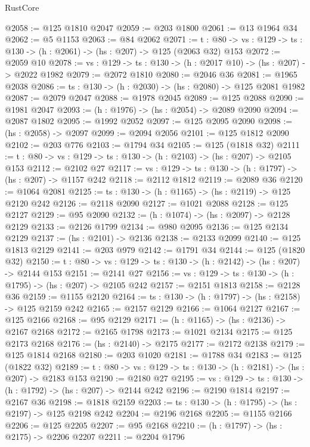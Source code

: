 \begin{lexlean}{RustCore}
\begin{coremodule}
@2058 := @125 @1810 @2047
@2059 := @203 @1800
@2061 := @13 @1964 @34
@2062 := @5 @1153
@2063 := @84 @2062
@2071 := {t : @80} ->
  {vs : @129} -> {ts : @130} -> (h : @2061) -> (hs : @207) -> @125 (@2063 @32) @153
@2072 := @2059 @10
@2078 := {vs : @129} -> {ts : @130} -> (h : @2017 @10) -> (hs : @207) -> @2022 @1982
@2079 := @2072 @1810
@2080 := @2046 @36
@2081 := @1965 @2038
@2086 := {ts : @130} -> (h : @2030) -> (hs : @2080) -> @125 @2081 @1982
@2087 := @2079 @2047
@2088 := @1978 @2045
@2089 := @125 @2088
@2090 := @1981 @2047
@2093 := (h : @1976) -> (hs : @2054) -> @2089 @2090
@2094 := @2087 @1802
@2095 := @1992 @2052
@2097 := @125 @2095 @2090
@2098 := (hs : @2058) -> @2097
@2099 := @2094 @2056
@2101 := @125 @1812 @2090
@2102 := @203 @776
@2103 := @1794 @34
@2105 := @125 (@1818 @32)
@2111 := {t : @80} -> {vs : @129} -> {ts : @130} -> (h : @2103) -> (hs : @207) -> @2105 @153
@2112 := @2102 @27
@2117 := {vs : @129} -> {ts : @130} -> (h : @1797) -> (hs : @207) -> @1157 @242
@2118 := @2112 @1812
@2119 := @2089 @36
@2120 := @1064 @2081
@2125 := {ts : @130} -> (h : @1165) -> (hs : @2119) -> @125 @2120 @242
@2126 := @2118 @2090
@2127 := @1021 @2088
@2128 := @125 @2127
@2129 := @95 @2090
@2132 := (h : @1074) -> (hs : @2097) -> @2128 @2129
@2133 := @2126 @1799
@2134 := @980 @2095
@2136 := @125 @2134 @2129
@2137 := (hs : @2101) -> @2136
@2138 := @2133 @2099
@2140 := @125 @1813 @2129
@2141 := @203 @979
@2142 := @1791 @34
@2144 := @125 (@1820 @32)
@2150 := {t : @80} -> {vs : @129} -> {ts : @130} -> (h : @2142) -> (hs : @207) -> @2144 @153
@2151 := @2141 @27
@2156 := {vs : @129} -> {ts : @130} -> (h : @1795) -> (hs : @207) -> @2105 @242
@2157 := @2151 @1813
@2158 := @2128 @36
@2159 := @1155 @2120
@2164 := {ts : @130} -> (h : @1797) -> (hs : @2158) -> @125 @2159 @242
@2165 := @2157 @2129
@2166 := @1064 @2127
@2167 := @125 @2166
@2168 := @95 @2129
@2171 := (h : @1165) -> (hs : @2136) -> @2167 @2168
@2172 := @2165 @1798
@2173 := @1021 @2134
@2175 := @125 @2173 @2168
@2176 := (hs : @2140) -> @2175
@2177 := @2172 @2138
@2179 := @125 @1814 @2168
@2180 := @203 @1020
@2181 := @1788 @34
@2183 := @125 (@1822 @32)
@2189 := {t : @80} -> {vs : @129} -> {ts : @130} -> (h : @2181) -> (hs : @207) -> @2183 @153
@2190 := @2180 @27
@2195 := {vs : @129} -> {ts : @130} -> (h : @1792) -> (hs : @207) -> @2144 @242
@2196 := @2190 @1814
@2197 := @2167 @36
@2198 := @1818 @2159
@2203 := {ts : @130} -> (h : @1795) -> (hs : @2197) -> @125 @2198 @242
@2204 := @2196 @2168
@2205 := @1155 @2166
@2206 := @125 @2205
@2207 := @95 @2168
@2210 := (h : @1797) -> (hs : @2175) -> @2206 @2207
@2211 := @2204 @1796

\end{coremodule}
\end{lexlean}
